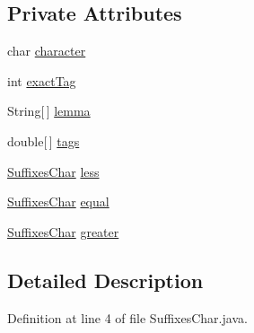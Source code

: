 \subsection*{Private Attributes}
\begin{DoxyCompactItemize}
\item 
char \hyperlink{classbr_1_1usp_1_1cata_1_1util_1_1lemmatizer_1_1_suffixes_char_af6c45eb644777282e0e16610045399c7}{character}
\item 
int \hyperlink{classbr_1_1usp_1_1cata_1_1util_1_1lemmatizer_1_1_suffixes_char_a7ad5f2b1449ee2407e6ee941ae92c4bc}{exact\+Tag}
\item 
String\mbox{[}$\,$\mbox{]} \hyperlink{classbr_1_1usp_1_1cata_1_1util_1_1lemmatizer_1_1_suffixes_char_a7d0da1fb5b1dff43e3ae87d85e2cb471}{lemma}
\item 
double\mbox{[}$\,$\mbox{]} \hyperlink{classbr_1_1usp_1_1cata_1_1util_1_1lemmatizer_1_1_suffixes_char_a3a403a4cc19ce7a9c5d0c279b7a06632}{tags}
\item 
\hyperlink{classbr_1_1usp_1_1cata_1_1util_1_1lemmatizer_1_1_suffixes_char}{Suffixes\+Char} \hyperlink{classbr_1_1usp_1_1cata_1_1util_1_1lemmatizer_1_1_suffixes_char_a99cfb426c538f5fc4c4f152b224853a1}{less}
\item 
\hyperlink{classbr_1_1usp_1_1cata_1_1util_1_1lemmatizer_1_1_suffixes_char}{Suffixes\+Char} \hyperlink{classbr_1_1usp_1_1cata_1_1util_1_1lemmatizer_1_1_suffixes_char_a474c4538e5a124c136b04071295d1e33}{equal}
\item 
\hyperlink{classbr_1_1usp_1_1cata_1_1util_1_1lemmatizer_1_1_suffixes_char}{Suffixes\+Char} \hyperlink{classbr_1_1usp_1_1cata_1_1util_1_1lemmatizer_1_1_suffixes_char_afebda070ee5e1d8ea7003700985357ed}{greater}
\end{DoxyCompactItemize}


\subsection{Detailed Description}


Definition at line 4 of file Suffixes\+Char.\+java.




